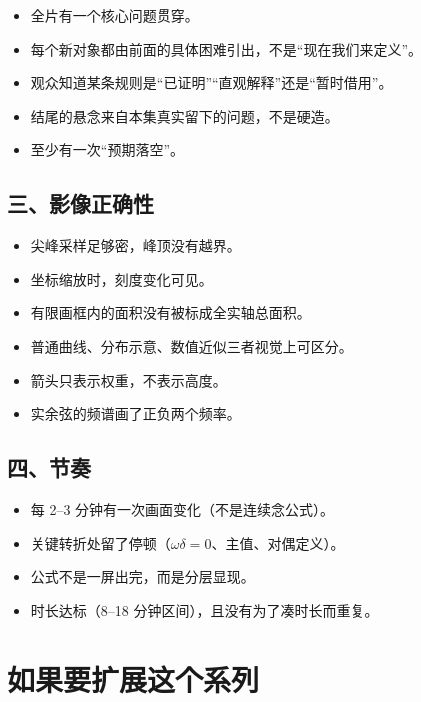 \begin{itemize}[leftmargin=1.6em,itemsep=0.25em]
\item[$\square$] 全片有一个核心问题贯穿。
\item[$\square$] 每个新对象都由前面的具体困难引出，不是“现在我们来定义”。
\item[$\square$] 观众知道某条规则是“已证明”“直观解释”还是“暂时借用”。
\item[$\square$] 结尾的悬念来自本集真实留下的问题，不是硬造。
\item[$\square$] 至少有一次“预期落空”。
\end{itemize}

\subsection*{三、影像正确性}

\begin{itemize}[leftmargin=1.6em,itemsep=0.25em]
\item[$\square$] 尖峰采样足够密，峰顶没有越界。
\item[$\square$] 坐标缩放时，刻度变化可见。
\item[$\square$] 有限画框内的面积没有被标成全实轴总面积。
\item[$\square$] 普通曲线、分布示意、数值近似三者视觉上可区分。
\item[$\square$] 箭头只表示权重，不表示高度。
\item[$\square$] 实余弦的频谱画了正负两个频率。
\end{itemize}

\subsection*{四、节奏}

\begin{itemize}[leftmargin=1.6em,itemsep=0.25em]
\item[$\square$] 每 2--3 分钟有一次画面变化（不是连续念公式）。
\item[$\square$] 关键转折处留了停顿（$\omega\delta=0$、主值、对偶定义）。
\item[$\square$] 公式不是一屏出完，而是分层显现。
\item[$\square$] 时长达标（8--18 分钟区间），且没有为了凑时长而重复。
\end{itemize}

\section{如果要扩展这个系列}

